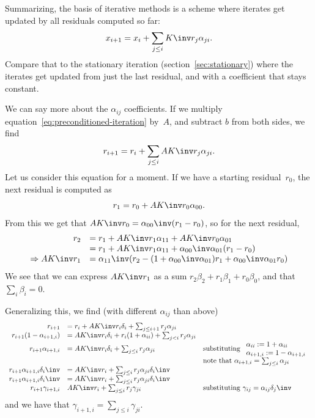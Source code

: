 Summarizing, the basis of iterative methods is a scheme where
iterates get updated by all residuals computed so far:
\begin{equation}
  x_{i+1} = x_i+\sum_{j\leq i}K\inv r_j\alpha_{ji}.
  \label{eq:preconditioned-iteration}
\end{equation}
Compare that to the stationary iteration
(section~\ref{sec:stationary}) where the iterates get updated from
just the last residual, and with a coefficient that stays constant.

We can say more about the $\alpha_{ij}$ coefficients.
If we multiply equation~\eqref{eq:preconditioned-iteration} by~$A$,
and subtract $b$ from both sides,
we find
\begin{equation}
  r_{i+1} = r_i+\sum_{j\leq i}AK\inv r_j\alpha_{ji}.
  \label{eq:general-r-update}
\end{equation}
Let us consider this equation for a moment. If we have a starting
residual~$r_0$, the next residual is computed as
\[ r_1=r_0+AK\inv r_0\alpha_{00}. \]
From this we get that $AK\inv r_0 = \alpha_{00}\inv(r_1-r_0)$, so
for the next residual,
\[
\begin{array}{rl}
  r_2&=r_1+AK\inv r_1\alpha_{11}+AK\inv r_0\alpha_{01}\\
  &=r_1+AK\inv r_1\alpha_{11}+\alpha_{00}\inv\alpha_{01}(r_1-r_0)\\
  \Rightarrow AK\inv r_1&=\alpha_{11}\inv
  (r_2-(1+\alpha_{00}\inv\alpha_{01})r_1+\alpha_{00}\inv\alpha_{01}r_0)
\end{array}
\]
We see that we can express $AK\inv r_1$ as a sum
$r_2\beta_2+r_1\beta_1+r_0\beta_0$, and that $\sum_i\beta_i=0$. 

Generalizing this, we find (with different $\alpha_{ij}$ than above)
\[ 
\begin{array}{rll}
  r_{i+1}&=r_i+AK\inv r_i\delta_i+\sum_{j\leq i+1}r_j\alpha_{ji}\\
  r_{i+1}(1-\alpha_{i+1,i})&=AK\inv r_i\delta_i +r_i(1+\alpha_{ii})
      +\sum_{j< i} r_j\alpha_{ji}\\
  r_{i+1}\alpha_{i+1,i}&=AK\inv r_i\delta_i +
      \sum_{j\leq i}r_j\alpha_{ji}
      &\vtop{
        \hbox{substituting $\begin{array}{ll}\alpha_{ii}:=1+\alpha_{ii}\\
        \alpha_{i+1,i}:=1-\alpha_{i+1,i}\end{array}$}
        \hbox{note that $\alpha_{i+1,i}=\sum_{j\leq i}\alpha_{ji}$}
        }\\
  r_{i+1}\alpha_{i+1,i}\delta_i\inv&=AK\inv r_i +\sum_{j\leq i}
  r_j\alpha_{ji}\delta_i\inv\\  
  r_{i+1}\alpha_{i+1,i}\delta_i\inv&=AK\inv r_i +\sum_{j\leq i}
      r_j\alpha_{ji}\delta_i\inv\\
  r_{i+1}\gamma_{i+1,i}&AK\inv r_i+\sum_{j\leq i} r_j\gamma_{ji}
      &\hbox{substituting $\gamma_{ij}=\alpha_{ij}\delta_j\inv$}
\end{array}
\]
and we have that $\gamma_{i+1,i}=\sum_{j\leq i}\gamma_{ji}$.

